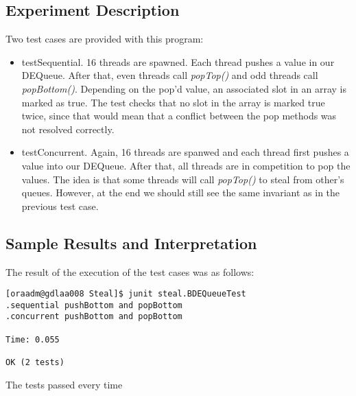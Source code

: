 \subsection{Experiment Description}
\par
Two test cases are provided with this program:
\begin{itemize}
\item testSequential. 16 threads are spawned. Each thread pushes a value in our
DEQueue. After that, even threads call \textit{popTop()} and odd threads call
\textit{popBottom()}. Depending on the pop'd value, an associated slot in an
array is marked as true. The test checks that no slot in the array is marked
true twice, since that would mean that a conflict between the pop methods was
not resolved correctly.
\item testConcurrent. Again, 16 threads are spanwed and each thread first pushes
a value into our DEQueue. After that, all threads are in competition to pop the
values. The idea is that some threads will call \textit{popTop()} to steal from
other's queues. However, at the end we should still see the same invariant as in
the previous test case.
\end{itemize}
\par
\subsection{Sample Results and Interpretation}
\par
The result of the execution of the test cases was as follows:
\par
\hfill
\begin{verbatim}
[oraadm@gdlaa008 Steal]$ junit steal.BDEQueueTest
.sequential pushBottom and popBottom
.concurrent pushBottom and popBottom

Time: 0.055

OK (2 tests)
\end{verbatim}
\hfill
\par
The tests passed every time
